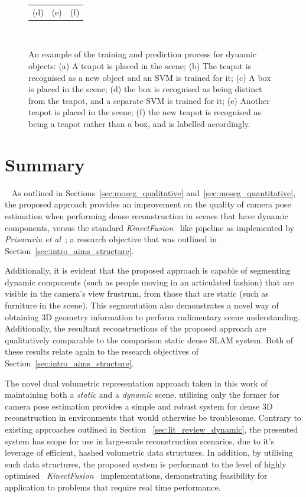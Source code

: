 \begin{figure}[!htbp]
\begin{tabular}{ccc}
    (d) & (e) & (f) \\
  \end{tabular}
  \caption[Motion Segmentation Object Recognition]
  {An example of the training and prediction process for dynamic
    objects:
    (a) A teapot is placed in the scene;
    (b) The teapot is recognised as a new object and an SVM is trained for it;
    (c) A box is placed in the scene; (d) the box is recognised as being
    distinct from the teapot, and a separate SVM is trained for it;
    (e) Another teapot is placed in the scene; (f) the new teapot is recognised
    as being a teapot rather than a box, and is labelled accordingly.}
~\label{figure:moseg_recognition}
\end{figure}

\section{Summary}
~\label{sec:moseg_discussion}
As outlined in Sections~\ref{sec:moseg_qualitative} and~\ref{sec:moseg_quantitative}, the 
proposed approach provides an improvement on the quality of camera pose estimation when 
performing dense reconstruction in scenes that have dynamic components, versus the 
standard \textit{KinectFusion}~\cite{Newcombe2011} like pipeline as implemented by 
\textit{Prisacariu et al}~\cite{Prisacariu2014}; a research objective that was outlined in 
Section~\ref{sec:intro_aims_structure}.

Additionally, it is evident that the proposed approach is capable of segmenting dynamic 
components (such as people moving in an articulated fashion) that are visible in the camera's 
view frustrum, from those that are static (such as furniture in the scene). This segmentation 
also demonstrates a novel way of obtaining 3D geometry information to perform rudimentary scene 
understanding. Additionally, the resultant reconstructions of the proposed approach are 
qualitatively comparable to the comparison static dense SLAM system. Both of these results 
relate again to the research objectives of Section~\ref{sec:intro_aims_structure}.

The novel dual volumetric representation approach taken in this work of maintaining both a 
\textit{static} and a \textit{dynamic} scene, utilising only the former for camera pose 
estimation provides a simple and robust system for dense 3D reconstruction in environments 
that would otherwise be troublesome. Contrary to existing approaches outlined in Section 
~\ref{sec:lit_review_dynamic}, the presented system has scope for use in large-scale 
reconstruction scenarios, due to it's leverage of efficient, hashed volumetric data structures. 
In addition, by utilising such data structures, the proposed system is performant to the 
level of highly optimised~\cite{Prisacariu2014} \textit{KinectFusion}~\cite{Newcombe2011} 
implementations, demonstrating feasibility for application to problems that require 
real time performance.

